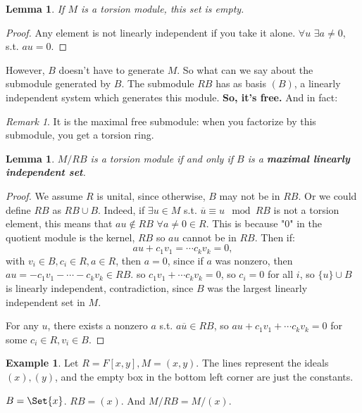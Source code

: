 \documentclass[9pt,reqno,twoside]{amsbook}
\theoremstyle{plain}
\numberwithin{section}{chapter}
\numberwithin{equation}{chapter}
\newtheorem{lem}[theorem]{Lemma}
\theoremstyle{definition}
\newtheorem{Ex}[theorem]{Example}
\theoremstyle{remark}
\newtheorem{rem}[theorem]{Remark}
\theoremstyle{plain}
\renewcommand{\bar}{\overline}%
\begin{document}
\begin{lem}
If $M$ is a torsion module, this set is empty. 
\end{lem}

\begin{proof}
Any element is not linearly independent if you take it alone. $\forall u$ $\exists a \neq 0$, s.t. $au = 0$. 
\end{proof}

However, $B$ doesn't have to generate $M$. So what can we say about the submodule generated by $B$. The submodule $RB$ has as basis $(B)$, a linearly independent system which generates this module. \textbf{So, it's free. } And in fact: 

\begin{rem}
It is the maximal free submodule: when you factorize by this submodule, you get a torsion ring. 
\end{rem}

\begin{lem}
$M/RB$ is a torsion module if and only if $B$ is a \textbf{maximal linearly independent set}. 
\end{lem}
\begin{proof}
We assume $R$ is unital, since otherwise, $B$ may not be in $RB$. Or we could define $RB$ as $RB \cup B$. 
Indeed, if $\exists u \in M$ s.t. $\overline{u} \equiv u \mod RB$ is not a torsion element, this means that $au \notin RB$ $\forall a \neq 0 \in R$. This is because "0" in the quotient module is the kernel, $RB$ so $au$ cannot be in $RB$. Then if: 
$$
au + c_1v_1 = \cdots c_kv_k = 0,
$$
 with $v_i \in B, c_i \in R, a \in R$, then $a = 0$, since if $a$ was nonzero, then $au = -c_1v_1 - \cdots - c_kv_k \in RB$. so $c_1v_1 + \cdots c_kv_k = 0$, so $c_i = 0$ for all $i$, so $\{u\}\cup B$ is linearly independent, contradiction, since $B$ was the largest linearly independent set in $M$. 
 
 For any $u$, there exists a nonzero $a$ s.t. $a\bar{u} \in RB$, so $au + c_1v_1 + \cdots c_kv_k = 0$ for some $c_i \in R,v_i \in B$. 
\end{proof}

\vspace{5mm}
\begin{Ex}
Let $R = F[x,y], M = (x,y)$. The lines represent the ideals $(x),(y)$, and the empty box in the bottom left corner are just the constants. 





$B = \Set{x}$. $RB = (x)$. And $M/RB = M/(x)$. 
\end{Ex}
\end{document}
